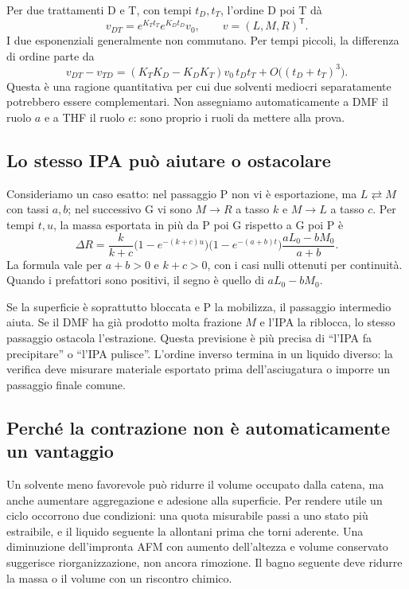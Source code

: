 \documentclass[11pt,reqno]{amsart}
\numberwithin{equation}{section}
\begin{document}
Per due trattamenti D e T, con tempi $t_D,t_T$, l'ordine D poi T
d\`a
\begin{equation}\label{eq:ordered}
 v_{DT}=e^{K_Tt_T}e^{K_Dt_D}v_0,
 \qquad v=(L,M,R)^{\mathsf T}.
\end{equation}
I due esponenziali generalmente non commutano. Per tempi piccoli,
la differenza di ordine parte da
\begin{equation}\label{eq:commutator}
 v_{DT}-v_{TD}=(K_TK_D-K_DK_T)v_0\,t_Dt_T+
 O\bigl((t_D+t_T)^3\bigr).
\end{equation}
Questa \`e una ragione quantitativa per cui due solventi
mediocri separatamente potrebbero essere complementari. Non
assegniamo automaticamente a DMF il ruolo $a$ e a THF il ruolo
$e$: sono proprio i ruoli da mettere alla prova.

\subsection{Lo stesso IPA pu\`o aiutare o ostacolare}
Consideriamo un caso esatto: nel passaggio P non vi \`e esportazione,
ma $L\rightleftarrows M$ con tassi $a,b$; nel successivo G vi sono
$M\to R$ a tasso $k$ e $M\to L$ a tasso $c$. Per tempi $t,u$,
la massa esportata in pi\`u da P poi G rispetto a G poi P \`e
\begin{equation}\label{eq:sign}
 \Delta R=
 \frac{k}{k+c}\bigl(1-e^{-(k+c)u}\bigr)
 \bigl(1-e^{-(a+b)t}\bigr)
 \frac{aL_0-bM_0}{a+b}.
\end{equation}
La formula vale per $a+b>0$ e $k+c>0$, con i casi nulli ottenuti
per continuit\`a. Quando i prefattori sono positivi, il segno
\`e quello di $aL_0-bM_0$.

Se la superficie \`e soprattutto bloccata e P la mobilizza,
il passaggio intermedio aiuta. Se il DMF ha gi\`a prodotto molta
frazione $M$ e l'IPA la riblocca, lo stesso passaggio ostacola
l'estrazione. Questa previsione \`e pi\`u precisa di ``l'IPA fa
precipitare'' o ``l'IPA pulisce''. L'ordine inverso termina in
un liquido diverso: la verifica deve misurare materiale esportato
prima dell'asciugatura o imporre un passaggio finale comune.

\subsection{Perch\'e la contrazione non \`e automaticamente un vantaggio}
Un solvente meno favorevole pu\`o ridurre il volume occupato dalla
catena, ma anche aumentare aggregazione e adesione alla superficie.
Per rendere utile un ciclo occorrono due condizioni: una quota
misurabile passi a uno stato pi\`u estraibile, e il liquido seguente
la allontani prima che torni aderente. Una diminuzione dell'impronta
AFM con aumento dell'altezza e volume conservato suggerisce
riorganizzazione, non ancora rimozione. Il bagno seguente deve
ridurre la massa o il volume con un riscontro chimico.
\end{document}
